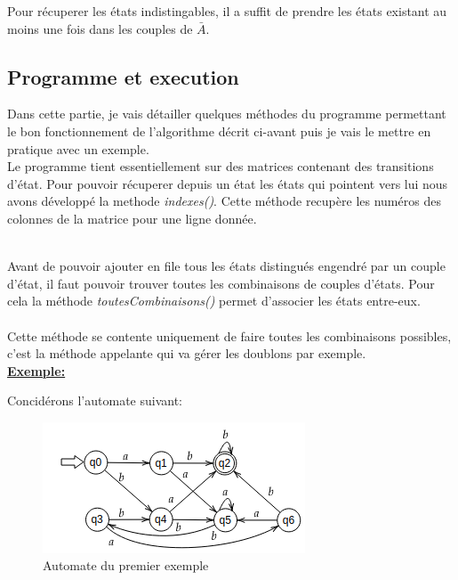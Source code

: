 \documentclass[a4paper]{article}
\begin{document}
Pour récuperer les états indistingables, il a suffit de prendre les états existant au moins
une fois dans les couples de $\bar{A}$.

\subsection{Programme et execution}

Dans cette partie, je vais détailler quelques méthodes du programme permettant le bon
fonctionnement de l'algorithme décrit ci-avant puis je vais le mettre en pratique avec un exemple.\\

Le programme tient essentiellement sur des matrices contenant des transitions d'état. Pour pouvoir
récuperer depuis un état les états qui pointent vers lui nous avons développé la methode 
\textit{indexes()}. Cette méthode recupère les numéros des colonnes de la matrice pour une ligne donnée.

\fbox{
	
}\\

Avant de pouvoir ajouter en file tous les états distingués engendré par un couple d'état, il faut
pouvoir trouver toutes les combinaisons de couples d'états. Pour cela la méthode \textit{toutesCombinaisons()}
permet d'associer les états entre-eux.\\

\fbox{
	
}\\

Cette méthode se contente uniquement de faire toutes les combinaisons possibles, c'est la méthode appelante
qui va gérer les doublons par exemple.\\

\textbf{\underline{Exemple:\\ }}

Concidérons l'automate suivant:\\


\begin{figure}[!h]
	\centering
	\includegraphics[scale=0.8]{src/auto1.png}
	\caption{Automate du premier exemple}
\end{figure}
\end{document}
